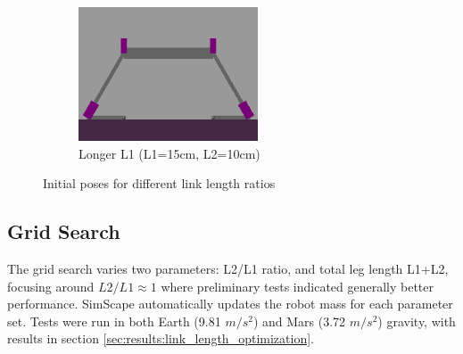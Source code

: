 \begin{figure}[h]
\begin{subfigure}[b]{0.32\textwidth}
    \end{subfigure}
    \hfill
    \begin{subfigure}[b]{0.32\textwidth}
        \centering
        \includegraphics[width=\textwidth]{Images/link_length_optimization/longer_L1_pose.png}
        \caption{Longer L1 (L1=15cm, L2=10cm)}
        \label{fig:link_length_optimization:longer_L1_pose}
    \end{subfigure}
    \caption{Initial poses for different link length ratios}
    \label{fig:link_length_optimization:initial_poses}
\end{figure}



\subsection{Grid Search}
The grid search varies two parameters: L2/L1 ratio, and total leg length L1+L2, focusing around $L2/L1\approx1$ where preliminary tests indicated generally better performance. SimScape automatically updates the robot mass for each parameter set. Tests were run in both Earth (9.81 $m/s^2$) and Mars (3.72 $m/s^2$) gravity, with results in section \ref{sec:results:link_length_optimization}.


